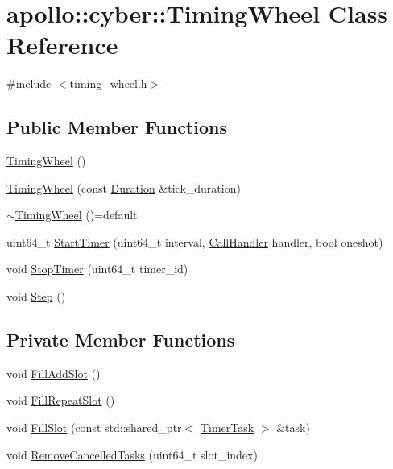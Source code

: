 \hypertarget{classapollo_1_1cyber_1_1TimingWheel}{\section{apollo\-:\-:cyber\-:\-:Timing\-Wheel Class Reference}
\label{classapollo_1_1cyber_1_1TimingWheel}
}


{\ttfamily \#include $<$timing\-\_\-wheel.\-h$>$}

\subsection*{Public Member Functions}
\begin{DoxyCompactItemize}
\item 
\hyperlink{classapollo_1_1cyber_1_1TimingWheel_ae79b915a0b8517bafe4390392428b434}{Timing\-Wheel} ()
\item 
\hyperlink{classapollo_1_1cyber_1_1TimingWheel_a0ae9c0f8a599ebd537441871832e492d}{Timing\-Wheel} (const \hyperlink{classapollo_1_1cyber_1_1Duration}{Duration} \&tick\-\_\-duration)
\item 
\hyperlink{classapollo_1_1cyber_1_1TimingWheel_aeb70bca6295f6f13455b8dce0b20e32a}{$\sim$\-Timing\-Wheel} ()=default
\item 
uint64\-\_\-t \hyperlink{classapollo_1_1cyber_1_1TimingWheel_a34dd74d1a19b281fc76cea4816288cf9}{Start\-Timer} (uint64\-\_\-t interval, \hyperlink{namespaceapollo_1_1cyber_a73f7b365c4d923725c0a03bfb8c97978}{Call\-Handler} handler, bool oneshot)
\item 
void \hyperlink{classapollo_1_1cyber_1_1TimingWheel_aa8f2eb8d8bb10b5ec0dcb6dc318fd340}{Stop\-Timer} (uint64\-\_\-t timer\-\_\-id)
\item 
void \hyperlink{classapollo_1_1cyber_1_1TimingWheel_ad21b93b1440bf76cac885f01f67bb730}{Step} ()
\end{DoxyCompactItemize}
\subsection*{Private Member Functions}
\begin{DoxyCompactItemize}
\item 
void \hyperlink{classapollo_1_1cyber_1_1TimingWheel_adecc7f4db3d9abad0ccb5ef738d27b8e}{Fill\-Add\-Slot} ()
\item 
void \hyperlink{classapollo_1_1cyber_1_1TimingWheel_a76133e3a7948b702e7fb008a9a0f48bb}{Fill\-Repeat\-Slot} ()
\item 
void \hyperlink{classapollo_1_1cyber_1_1TimingWheel_a2a839c737caf05cfb58f6bdcb19dd4d9}{Fill\-Slot} (const std\-::shared\-\_\-ptr$<$ \hyperlink{classapollo_1_1cyber_1_1TimerTask}{Timer\-Task} $>$ \&task)
\item 
void \hyperlink{classapollo_1_1cyber_1_1TimingWheel_a797d44ac4f49e013c89fe0d07217a9af}{Remove\-Cancelled\-Tasks} (uint64\-\_\-t slot\-\_\-index)
\end{DoxyCompactItemize}

